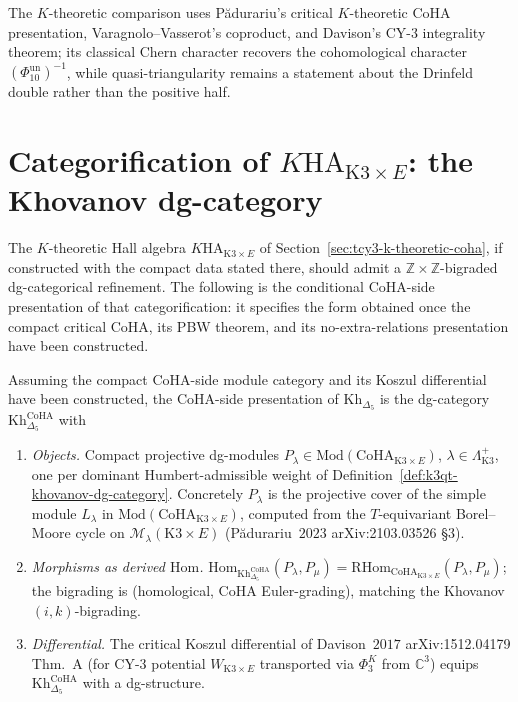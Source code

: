 \noindent The \(K\)-theoretic comparison uses P\u{a}durariu's critical
\(K\)-theoretic CoHA presentation, Varagnolo--Vasserot's coproduct,
and Davison's CY-\(3\) integrality theorem; its classical Chern
character recovers the cohomological character
\((\Phi_{10}^{\mathrm{un}})^{-1}\), while quasi-triangularity remains a
statement about the Drinfeld double rather than the positive half.

\section{Categorification of \texorpdfstring{$K\mathrm{HA}_{\mathrm{K3}\times E}$}{KHA-K3x E}:
the Khovanov dg-category}
\label{sec:tcy3-khovanov-categorification}

The $K$-theoretic Hall algebra $K\mathrm{HA}_{\mathrm{K3}\times E}$ of
Section~\ref{sec:tcy3-k-theoretic-coha}, if constructed with the compact
data stated there, should admit a $\mathbb Z\times\mathbb Z$-bigraded
dg-categorical refinement. The following is the conditional CoHA-side
presentation of that categorification: it specifies the form obtained
once the compact critical CoHA, its PBW theorem, and its
no-extra-relations presentation have been constructed.

\begin{definition}
\label{def:tcy3-khovanov-coha-side}
Assuming the compact CoHA-side module category and its Koszul
differential have been constructed, the CoHA-side presentation of
$\mathrm{Kh}_{\Delta_5}$ is the dg-category
$\mathrm{Kh}_{\Delta_5}^{\mathrm{CoHA}}$ with
\begin{enumerate}[label=\textup{(\roman*)}]
\item \emph{Objects.} Compact projective dg-modules
$P_\lambda\in\mathrm{Mod}(\mathrm{CoHA}_{\mathrm{K3}\times E})$,
$\lambda\in\Lambda_{\mathrm{K3}}^+$, one per dominant
Humbert-admissible weight of
Definition~\ref{def:k3qt-khovanov-dg-category}. Concretely
$P_\lambda$ is the projective cover of the simple module $L_\lambda$
in $\mathrm{Mod}(\mathrm{CoHA}_{\mathrm{K3}\times E})$, computed
from the $T$-equivariant Borel--Moore cycle on
$\mathcal M_\lambda(\mathrm{K3}\times E)$
(P\u{a}durariu~$2023$ arXiv:2103.03526 \S $3$).
\item \emph{Morphisms as derived $\mathrm{Hom}$.}
$\mathrm{Hom}_{\mathrm{Kh}_{\Delta_5}^{\mathrm{CoHA}}}(P_\lambda, P_\mu) =
\mathrm{RHom}_{\mathrm{CoHA}_{\mathrm{K3}\times E}}(P_\lambda, P_\mu)$;
the bigrading is (homological, CoHA Euler-grading), matching the
Khovanov $(i, k)$-bigrading.
\item \emph{Differential.} The critical Koszul differential of
Davison~$2017$ arXiv:1512.04179 Thm.\ A (for CY-$3$ potential
$W_{\mathrm K3\times E}$ transported via $\Phi_3^K$ from
$\mathbb C^3$) equips
$\mathrm{Kh}_{\Delta_5}^{\mathrm{CoHA}}$ with a dg-structure.
\end{enumerate}
\end{definition}

